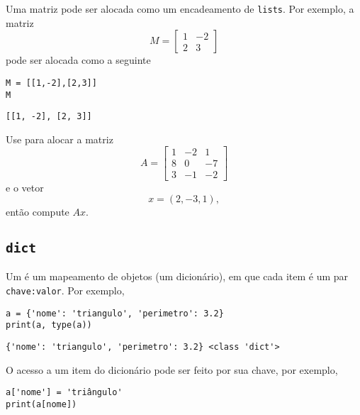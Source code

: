 \documentclass[a4paper,10pt,twoside]{article}
\begin{document}
\begin{exr}
  Uma matriz pode ser alocada como um encadeamento de \texttt{lists}. Por exemplo, a matriz
  \begin{equation}
    M =
    \begin{bmatrix}
      1 & -2 \\
      2 & 3
    \end{bmatrix}
  \end{equation}
  pode ser alocada como a seguinte {\PYTHONlist}

\begin{lstlisting}
M = [[1,-2],[2,3]]
M
\end{lstlisting}

\begin{verbatim}
[[1, -2], [2, 3]]
\end{verbatim}

  Use {\PYTHONlist} para alocar a matriz
  \begin{equation}
    A =
    \begin{bmatrix}
      1 & -2 & 1\\
      8 & 0 & -7\\
      3 & -1 & -2
    \end{bmatrix}
  \end{equation}
  e o vetor
  \begin{equation}
    x = (2, -3, 1),
  \end{equation}
  então compute $Ax$.
\end{exr}

\subsection{\texttt{dict}}

Um {\PYTHONdict} é um mapeamento de objetos (um dicionário), em que cada item é um par \texttt{chave:valor}. Por exemplo,

\begin{lstlisting}
a = {'nome': 'triangulo', 'perimetro': 3.2}
print(a, type(a))
\end{lstlisting}

\begin{verbatim}
{'nome': 'triangulo', 'perimetro': 3.2} <class 'dict'>
\end{verbatim}


O acesso a um item do dicionário pode ser feito por sua chave, por exemplo,

\begin{lstlisting}
a['nome'] = 'triângulo'
print(a[nome])
\end{lstlisting}
\end{document}
